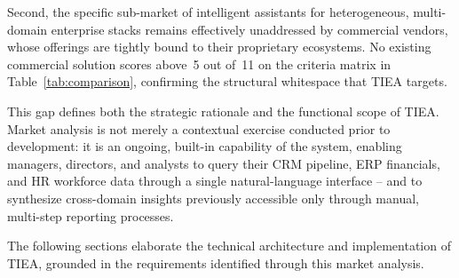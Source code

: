 \documentclass[12pt,a4paper]{report}
\begin{document}
Second, the specific sub-market of intelligent assistants for heterogeneous, multi-domain enterprise
stacks remains effectively unaddressed by commercial vendors, whose offerings are tightly bound to
their proprietary ecosystems.
No existing commercial solution scores above~5 out of~11 on the criteria matrix in
Table~\ref{tab:comparison}, confirming the structural whitespace that TIEA targets.

This gap defines both the strategic rationale and the functional scope of TIEA.
Market analysis is not merely a contextual exercise conducted prior to development: it is an
ongoing, built-in capability of the system, enabling managers, directors, and analysts to query
their CRM pipeline, ERP financials, and HR workforce data through a single natural-language
interface -- and to synthesize cross-domain insights previously accessible only through manual,
multi-step reporting processes.

The following sections elaborate the technical architecture and implementation of TIEA, grounded
in the requirements identified through this market analysis.

\end{document}
